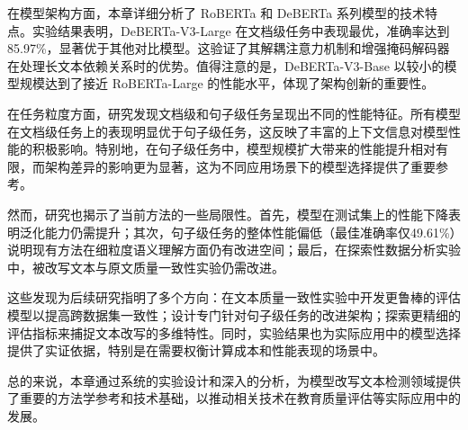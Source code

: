 在模型架构方面，本章详细分析了 RoBERTa 和 DeBERTa 系列模型的技术特点。实验结果表明，DeBERTa-V3-Large 在文档级任务中表现最优，准确率达到 85.97\%，显著优于其他对比模型。这验证了其解耦注意力机制和增强掩码解码器在处理长文本依赖关系时的优势。值得注意的是，DeBERTa-V3-Base 以较小的模型规模达到了接近 RoBERTa-Large 的性能水平，体现了架构创新的重要性。

在任务粒度方面，研究发现文档级和句子级任务呈现出不同的性能特征。所有模型在文档级任务上的表现明显优于句子级任务，这反映了丰富的上下文信息对模型性能的积极影响。特别地，在句子级任务中，模型规模扩大带来的性能提升相对有限，而架构差异的影响更为显著，这为不同应用场景下的模型选择提供了重要参考。

然而，研究也揭示了当前方法的一些局限性。首先，模型在测试集上的性能下降表明泛化能力仍需提升；其次，句子级任务的整体性能偏低（最佳准确率仅49.61\%）说明现有方法在细粒度语义理解方面仍有改进空间；最后，在探索性数据分析实验中，被改写文本与原文质量一致性实验仍需改进。

这些发现为后续研究指明了多个方向：在文本质量一致性实验中开发更鲁棒的评估模型以提高跨数据集一致性；设计专门针对句子级任务的改进架构；探索更精细的评估指标来捕捉文本改写的多维特性。同时，实验结果也为实际应用中的模型选择提供了实证依据，特别是在需要权衡计算成本和性能表现的场景中。

总的来说，本章通过系统的实验设计和深入的分析，为模型改写文本检测领域提供了重要的方法学参考和技术基础，以推动相关技术在教育质量评估等实际应用中的发展。